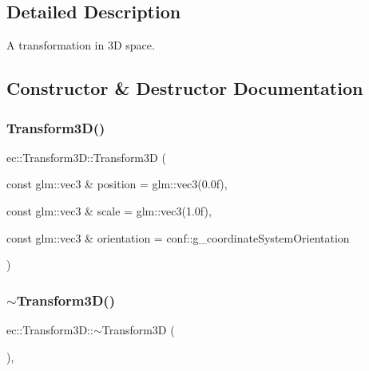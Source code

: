\subsection{Detailed Description}
A transformation in 3D space. 

\subsection{Constructor \& Destructor Documentation}
\mbox{\label{classec_1_1_transform3_d_adb5c661621922b1a3a6e6433ce1c79f6}} 
\subsubsection{\texorpdfstring{Transform3\+D()}{Transform3D()}}
{\footnotesize\ttfamily ec\+::\+Transform3\+D\+::\+Transform3D (\begin{DoxyParamCaption}\item[{const glm\+::vec3 \&}]{position = {\ttfamily glm\+:\+:vec3(0.0f)},  }\item[{const glm\+::vec3 \&}]{scale = {\ttfamily glm\+:\+:vec3(1.0f)},  }\item[{const glm\+::vec3 \&}]{orientation = {\ttfamily conf\+:\+:g\+\_\+coordinateSystemOrientation} }\end{DoxyParamCaption})\hspace{0.3cm}{\ttfamily [explicit]}}

\mbox{\label{classec_1_1_transform3_d_a1df4b7afcf78aef64719b2302cfac864}} 
\subsubsection{\texorpdfstring{$\sim$\+Transform3\+D()}{~Transform3D()}}
{\footnotesize\ttfamily ec\+::\+Transform3\+D\+::$\sim$\+Transform3D (\begin{DoxyParamCaption}{ }\end{DoxyParamCaption})\hspace{0.3cm}{\ttfamily [virtual]}, {\ttfamily [default]}}



